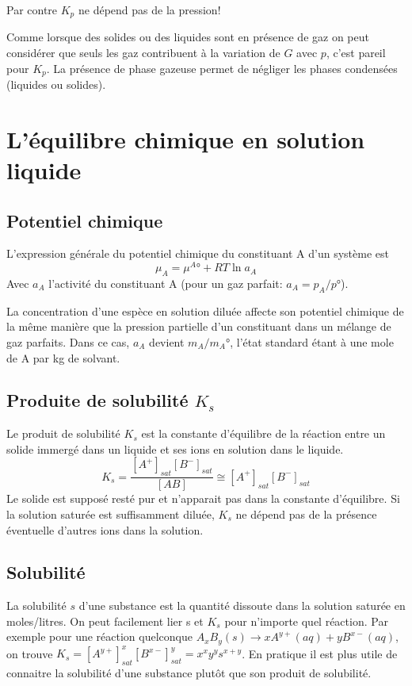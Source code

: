 Par contre $K_p$ ne dépend pas de la pression!

Comme lorsque des solides ou des liquides sont en présence de gaz on peut
considérer que seuls les gaz contribuent à la variation de $G$ avec $p$,
c'est pareil pour $K_p$.
La présence de phase gazeuse permet de négliger
les phases condensées (liquides ou solides).

\section{L'équilibre chimique en solution liquide}
\subsection{Potentiel chimique}
L'expression générale du potentiel chimique du constituant A d'un système est
\[ \mu_A = \mu^A°+RT \ln a_A \]
Avec $a_A$ l'activité du constituant A (pour un gaz parfait: $a_A = p_A/p°$).

La concentration d'une espèce en solution diluée affecte son potentiel
chimique de la même manière que la pression partielle
d'un constituant dans un mélange de gaz parfaits.
Dans ce cas, $a_A$ devient $m_A/m_A°$,
l'état standard étant à une mole de A par kg de solvant.

\subsection{Produite de solubilité $K_s$}
Le produit de solubilité $K_s$ est la constante d'équilibre
de la réaction entre un solide immergé dans un liquide et
ses ions en solution dans le liquide.
\[ K_s = \frac{[A^+]_{sat}[B^-]_{sat}}{[AB]}\cong [A^+]_{sat}[B^-]_{sat} \]
Le solide est supposé resté pur et n'apparait pas dans la constante d'équilibre.
Si la solution saturée est suffisamment diluée,
$K_s$ ne dépend pas de la présence éventuelle d'autres ions dans la solution.

\subsection{Solubilité}
La solubilité $s$ d'une substance est la quantité dissoute
dans la solution saturée en moles/litres.
On peut facilement lier s et $K_s$ pour n'importe quel réaction.
Par exemple pour une réaction quelconque
$A_xB_y(s)\longrightarrow xA^{y+}(aq)+yB^{x-}(aq)$,
on trouve $K_s = [A^{y+}]^x_{sat}[B^{x-}]^y_{sat} = x^xy^ys^{x+y}$.
En pratique il est plus utile de connaitre la solubilité
d'une substance plutôt que son produit de solubilité.

